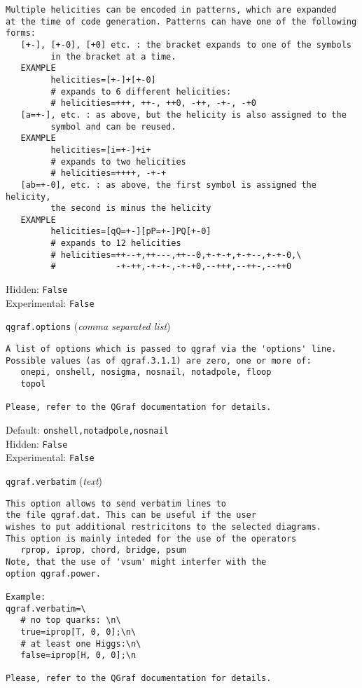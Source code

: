 \begin{basedescript}{\desclabelstyle{\pushlabel}}
\begin{verbatim}
Multiple helicities can be encoded in patterns, which are expanded
at the time of code generation. Patterns can have one of the following
forms:
   [+-], [+-0], [+0] etc. : the bracket expands to one of the symbols
         in the bracket at a time.
   EXAMPLE
         helicities=[+-]+[+-0]
         # expands to 6 different helicities:
         # helicities=+++, ++-, ++0, -++, -+-, -+0
   [a=+-], etc. : as above, but the helicity is also assigned to the
         symbol and can be reused.
   EXAMPLE
         helicities=[i=+-]+i+
         # expands to two helicities
         # helicities=++++, -+-+
   [ab=+-0], etc. : as above, the first symbol is assigned the helicity,
         the second is minus the helicity
   EXAMPLE
         helicities=[qQ=+-][pP=+-]PQ[+-0]
         # expands to 12 helicities
         # helicities=++--+,++---,++--0,+-+-+,+-+--,+-+-0,\
         #            -+-++,-+-+-,-+-+0,--+++,--++-,--++0
\end{verbatim}
Hidden: \verb|False|
\\Experimental: \verb|False|
\\\item[\colorbox{gray!30}{\texttt{qgraf.options}}] (\textit{comma separated list})
\begin{verbatim}
A list of options which is passed to qgraf via the 'options' line.
Possible values (as of qgraf.3.1.1) are zero, one or more of:
   onepi, onshell, nosigma, nosnail, notadpole, floop
   topol

Please, refer to the QGraf documentation for details.
\end{verbatim}
Default: \verb|onshell,notadpole,nosnail|
\\Hidden: \verb|False|
\\Experimental: \verb|False|
\\\item[\colorbox{gray!30}{\texttt{qgraf.verbatim}}] (\textit{text})
\begin{verbatim}
This option allows to send verbatim lines to
the file qgraf.dat. This can be useful if the user
wishes to put additional restricitons to the selected diagrams.
This option is mainly inteded for the use of the operators
   rprop, iprop, chord, bridge, psum
Note, that the use of 'vsum' might interfer with the
option qgraf.power.

Example:
qgraf.verbatim=\
   # no top quarks: \n\
   true=iprop[T, 0, 0];\n\
   # at least one Higgs:\n\
   false=iprop[H, 0, 0];\n

Please, refer to the QGraf documentation for details.


\end{verbatim}
\end{basedescript}
